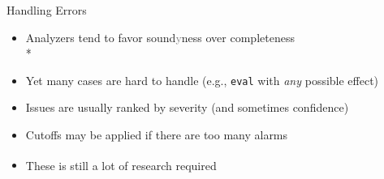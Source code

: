 \documentclass[
   aspectratio=169, %
   10pt, %
   uniqueslidenumber,
   handout,
   professionalfonts
]{beamer}
\def\sbseries{\fontseries{sb}\selectfont}
\def\textsb#1{{\sbseries#1}}
\begin{document}
\begin{frame}{Handling Errors}
   \begin{itemize}
      \itemsep8pt
      \item<2-> Analyzers tend to \textsb{favor sound\textcolor{gray}{y}ness over completeness}\\*
      \item<4-> Yet many cases are hard to handle (e.g., \texttt{eval} with \textit{any} possible effect)
      \item<5-> Issues are usually ranked by severity (and sometimes confidence)
      \item<6-> Cutoffs may be applied if there are too many alarms
      \item<7-> These is still a lot of research required\,\textsuperscript{\smaller[2]\cite[p.\,705]{DBLP:journals/entcs/EmanuelssonN08,cousout2021principles}}
   \end{itemize}
\end{frame}
\end{document}
